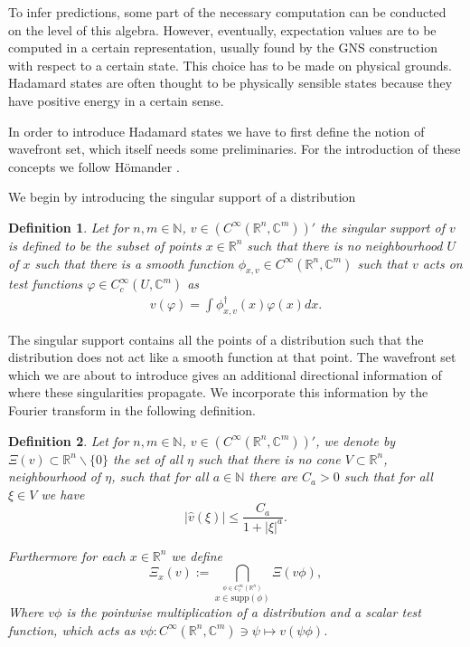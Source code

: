 \documentclass[b5paper,draft,openbib,12pt]{memoir}
\newtheorem{Def}{Definition}
\begin{document}
To infer predictions, some part of the necessary computation can be conducted on the level of this algebra. However,
eventually, expectation values are to be computed in a certain representation, usually found by the GNS construction
with respect to a certain state.
This choice has to be made on physical grounds. 
Hadamard states are often thought to be physically sensible states because they have positive energy in a certain sense.

In order to introduce Hadamard states we have to first define the notion of wavefront set, which itself needs some preliminaries. 
For the introduction of these concepts we follow Hömander \cite[Chapter 8]{hormander2003analysis}.

We begin by introducing the singular support of a distribution

\begin{Def}
Let for \(n,m\in\mathbb{N}\),  \(v\in (C^\infty(\mathbb{R}^n,\mathbb{C}^m))'\) the singular support of \(v\) is defined to be the subset of points \(x\in \mathbb{R}^n\) such
that there is no neighbourhood \(U\) of \(x\) such that there is a smooth function \(\phi_{x,v}\in C^\infty (\mathbb{R}^n,\mathbb{C}^m)\) such that \(v\) acts on 
test functions \(\varphi \in C^\infty_c (U,\mathbb{C}^m)\) as
\begin{align}
v(\varphi)=\int \phi^\dagger_{x,v} (x) \varphi(x) dx.
\end{align}
\end{Def}

The singular support contains all the points of a distribution such that the distribution does not act like a smooth function at that point. The wavefront set which we are
about to introduce gives an additional directional information of where these singularities propagate. We incorporate this information by the Fourier transform 
in the following definition.

\begin{Def}
Let for \(n,m\in\mathbb{N}\),  \(v\in (C^\infty(\mathbb{R}^n,\mathbb{C}^m))'\), we denote by \(\Xi(v)\subset \mathbb{R}^n\backslash\{0\}\) the set of all \(\eta\) such that there is no
cone \(V\subset \mathbb{R}^n\), neighbourhood of \(\eta\), such that for all \(a\in\mathbb{N}\) there are \(C_a>0\) such that for all \(\xi\in V\) we have
\begin{equation}
|\hat{v}(\xi)|\le \frac{C_a}{1+|\xi|^a}.
\end{equation}

Furthermore for each \(x\in \mathbb{R}^n\) we define 
\begin{equation}
\Xi_x (v) := \bigcap_{\overset{\phi \in C^\infty_c (\mathbb{R}^n)}{x\in \mathrm{supp}(\phi)}} \Xi(v \phi),
\end{equation}
Where \(v\phi\) is the pointwise multiplication of a distribution and a scalar test function, which acts as \(v\phi: C^\infty(\mathbb{R}^n,\mathbb{C}^m)\ni \psi\mapsto v(\psi \phi)\). 
\end{Def}
\end{document}
